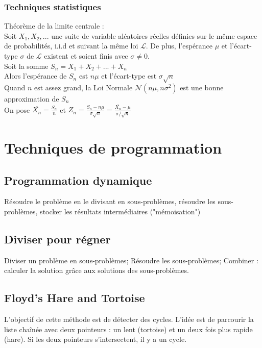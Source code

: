\documentclass[8pt]{article}
\begin{document}
            \subsubsection{Techniques statistiques}
            Théorème de la limite centrale : \\
            Soit $X_1,X_2,...$ une suite de variable aléatoires réelles définies sur le même espace de probabilités, i.i.d et suivant la même loi $\mathcal{L}$.
            De plus, l'espérance $\mu$ et l'écart-type $\sigma$ de $\mathcal{L}$ existent et soient finis avec $\sigma \neq 0$.\\
            Soit la somme $S_n = X_1 + X_2 + ... + X_n$\\
            Alors l'espérance de $S_n$ est $n\mu$ et l'écart-type est $\sigma \sqrt{n}$\\
            Quand $n$ est assez grand, la Loi Normale $\mathcal{N}(n\mu,n\sigma^{2})$ est une bonne approximation de $S_n$\\
            On pose $\overline{X_n} = \frac{S_n}{n}$ et $Z_n = \frac{S_n-n\mu}{\sigma \sqrt{n}} = \frac{\overline{X_n}-\mu}{\sigma / \sqrt{n}}$
    \section{Techniques de programmation}
        \subsection{Programmation dynamique}
        Résoudre le problème en le divisant en sous-problèmes, résoudre les sous-problèmes, stocker les résultats
        intermédiaires ("mémoisation")
        \subsection{Diviser pour régner}
        Diviser un problème en sous-problèmes; Résoudre les sous-problèmes; Combiner : calculer la solution grâce aux
        solutions des sous-problèmes.
        \subsection{Floyd's Hare and Tortoise}
        L'objectif de cette méthode est de détecter des cycles. L'idée est de parcourir la liste chaînée
        avec deux pointeurs : un lent (tortoise) et un deux fois plus rapide (hare). Si les deux pointeurs
        s'intersectent, il y a un cycle.
\end{document}
